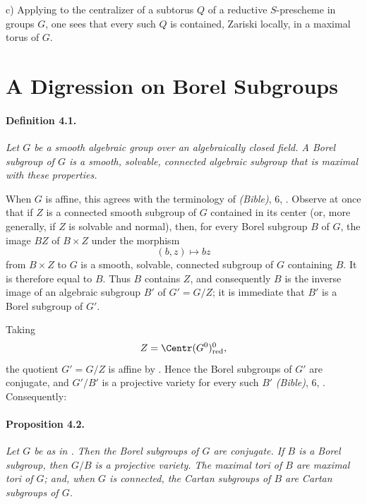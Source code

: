 \smallskip
\noindent
\textup{c)}
Applying  to the centralizer of a subtorus \(Q\) of a reductive
\(S\)-prescheme in groups \(G\), one sees that every such \(Q\) is
contained, Zariski locally, in a maximal torus of \(G\).



\section{A Digression on Borel Subgroups}

\paragraph{\textbf{Definition 4.1.}}
{\itshape Let \(G\) be a smooth algebraic group over an algebraically
closed field. A \emph{Borel subgroup} of \(G\) is a smooth, solvable,
connected algebraic subgroup that is maximal with these properties.}

When \(G\) is affine, this agrees with the terminology of
\textup{\emph{(Bible)}, 6, }. Observe at once that if
\(Z\) is a connected smooth subgroup of \(G\) contained in its center
\textup{(or, more generally, if \(Z\) is solvable and normal)}, then,
for every Borel subgroup \(B\) of \(G\), the image \(BZ\) of
\(B\times Z\) under the morphism
\[
  (b,z)\longmapsto bz
\]
from \(B\times Z\) to \(G\) is a smooth, solvable, connected subgroup
of \(G\) containing \(B\). It is therefore equal to \(B\). Thus \(B\)
contains \(Z\), and consequently \(B\) is the inverse image of an
algebraic subgroup \(B'\) of \(G'=G/Z\); it is immediate that \(B'\)
is a Borel subgroup of \(G'\).

Taking
\[
  Z=\Centr(G^0)_{\mathrm{red}}^0,
\]
the quotient \(G'=G/Z\) is affine by . Hence the Borel
subgroups of \(G'\) are conjugate, and \(G'/B'\) is a projective
variety for every such \(B'\)
\textup{\emph{(Bible)}, 6, }. Consequently:

\paragraph{\textbf{Proposition 4.2.}}
{\itshape Let \(G\) be as in . Then the Borel subgroups of \(G\)
are conjugate. If \(B\) is a Borel subgroup, then \(G/B\) is a
projective variety. The maximal tori of \(B\) are maximal tori of
\(G\); and, when \(G\) is connected, the Cartan subgroups of \(B\)
are Cartan subgroups of \(G\).}

